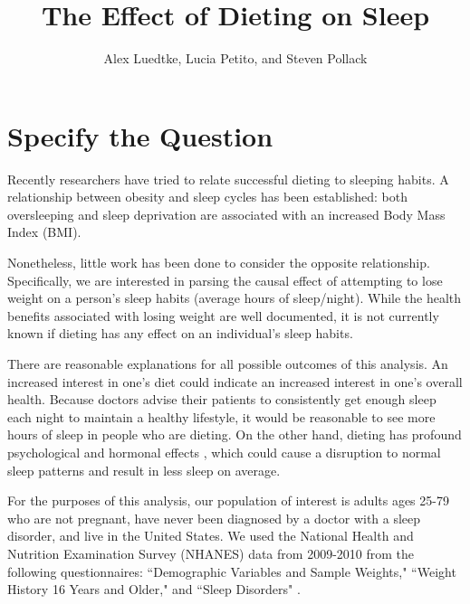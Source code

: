 \documentclass{article}
\begin{document}
%

\newcommand{\E}{\mathbb{E}}
\newcommand{\indp}{\ensuremath{\perp\hspace{-5pt}\perp}}
\newcommand{\M}{\mathcal{M}}
\newcommand{\given}{\; \mid \;}



\title{\textbf{The Effect of Dieting on Sleep}}
\author{Alex Luedtke, Lucia Petito, and Steven Pollack}
\date{}
\maketitle

\section{Specify the Question}

Recently researchers have tried to relate successful dieting to sleeping habits.  A relationship between obesity and sleep cycles has been established: both oversleeping \cite{sgain} and sleep deprivation \cite{sloss} are associated with an increased Body Mass Index (BMI). 

Nonetheless, little work has been done to consider the opposite relationship. Specifically, we are interested in parsing the causal effect of attempting to lose weight on a person's sleep habits (average hours of sleep/night). While the health benefits associated with losing weight are well documented, it is not currently known if dieting has any effect on an individual's sleep habits.

There are reasonable explanations for all possible outcomes of this analysis.  An increased interest in one's diet could indicate an increased interest in one's overall health.  Because doctors advise their patients to consistently get enough sleep each night to maintain a healthy lifestyle, it would be reasonable to see more hours of sleep in people who are dieting.  On the other hand, dieting has profound psychological and hormonal effects \cite{hormone}, which could cause a disruption to normal sleep patterns and result in less sleep on average.

For the purposes of this analysis, our population of interest is adults ages 25-79 who are not pregnant, have never been diagnosed by a doctor with a sleep disorder, and live in the United States.  We used the National Health and Nutrition Examination Survey (NHANES) data from 2009-2010 \cite{data} from the following questionnaires: ``Demographic Variables and Sample Weights," ``Weight History 16 Years and Older," and ``Sleep Disorders" \cite{questionnaire}.
\end{document}
